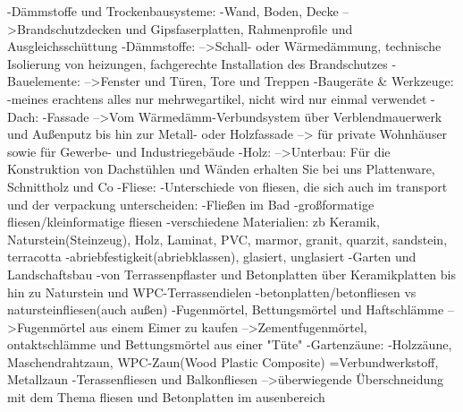                 -Dämmstoffe und Trockenbausysteme: %
                    -Wand, Boden, Decke
                        -->Brandschutzdecken und Gipsfaserplatten, Rahmenprofile und Ausgleichsschüttung
                    -Dämmstoffe:
                        -->Schall- oder Wärmedämmung, technische Isolierung von heizungen, fachgerechte Installation des Brandschutzes
                    -Bauelemente:
                        -->Fenster und Türen, Tore und Treppen
                -Baugeräte & Werkzeuge:
                    -meines erachtens alles nur mehrwegartikel, nicht wird nur einmal verwendet
                -Dach:
                    -Fassade
                        -->Vom Wärmedämm-Verbundsystem über Verblendmauerwerk und Außenputz bis hin zur Metall- oder Holzfassade
                        --> für private Wohnhäuser sowie für Gewerbe- und Industriegebäude
                    -Holz:
                        -->Unterbau: Für die Konstruktion von Dachstühlen und Wänden erhalten Sie bei uns Plattenware, Schnittholz und Co
                -Fliese:
                    -Unterschiede von fliesen, die sich auch im transport und der verpackung unterscheiden:
                        -Fließen im Bad
                        -großformatige fliesen/kleinformatige fliesen
                        -verschiedene Materialien: zb Keramik, Naturstein(Steinzeug), Holz, Laminat, PVC, marmor, granit, quarzit, sandstein, terracotta
                        -abriebfestigkeit(abriebklassen), glasiert, unglasiert
                -Garten und Landschaftsbau
                        -von Terrassenpflaster und Betonplatten über Keramikplatten bis hin zu Naturstein und WPC-Terrassendielen
                    -betonplatten/betonfliesen vs natursteinfliesen(auch außen)
                    -Fugenmörtel, Bettungsmörtel und Haftschlämme
                        -->Fugenmörtel aus einem Eimer zu kaufen
                        -->Zementfugenmörtel, ontaktschlämme und Bettungsmörtel aus einer "Tüte"
                    -Gartenzäune:
                        -Holzzäune, Maschendrahtzaun, WPC-Zaun(Wood Plastic Composite) =Verbundwerkstoff, Metallzaun
                    -Terassenfliesen und Balkonfliesen
                        -->überwiegende Überschneidung mit dem Thema fliesen und Betonplatten im ausenbereich
